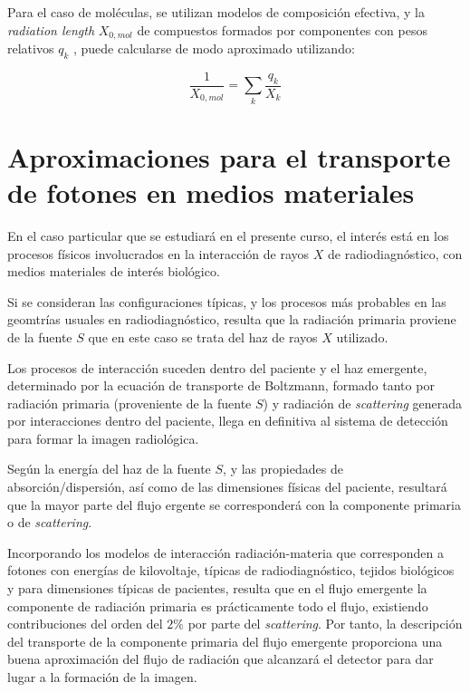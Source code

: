Para el caso de moléculas, se utilizan modelos de composición efectiva, y la \emph{radiation length} $X_{0,mol}$ de compuestos formados por componentes con pesos relativos $q_{k}$ , puede calcularse de modo aproximado utilizando:

\begin{equation}
 \frac{1}{X_{0, mol}} = \sum_{k} \frac{q_{k}}{X_{k}}
\end{equation}

\section{Aproximaciones para el transporte de fotones en medios materiales}

En el caso particular que se estudiará en el presente curso, el interés está en los procesos físicos involucrados en la interacción de rayos $X$ de radiodiagnóstico, con medios materiales de interés biológico.

Si se consideran las configuraciones típicas, y los procesos más probables en las geomtrías usuales en radiodiagnóstico, resulta que la radiación primaria proviene de la fuente $S$ que en este caso se trata del haz de rayos $X$ utilizado.

Los procesos de interacción suceden dentro del paciente y el haz emergente, determinado por la ecuación de transporte de Boltzmann, formado tanto por radiación primaria (proveniente de la fuente $S$) y radiación de \emph{scattering} generada por interacciones dentro del paciente, llega en definitiva al sistema de detección para formar la imagen radiológica.

Según la energía del haz de la fuente $S$, y las propiedades de absorción/dispersión, así como de las dimensiones físicas del paciente, resultará que la mayor parte del flujo ergente se corresponderá con la componente primaria o de \emph{scattering}.

Incorporando los modelos de interacción radiación-materia que corresponden a fotones con energías de kilovoltaje, típicas de radiodiagnóstico, tejidos biológicos y para dimensiones típicas de pacientes, resulta que en el flujo emergente la componente de radiación primaria es prácticamente todo el flujo, existiendo contribuciones del orden del $2 \%$ por parte del \emph{scattering}. Por tanto, la descripción del transporte de la componente primaria del flujo emergente proporciona una buena aproximación del flujo de radiación que alcanzará el detector para dar lugar a la formación de la imagen.

